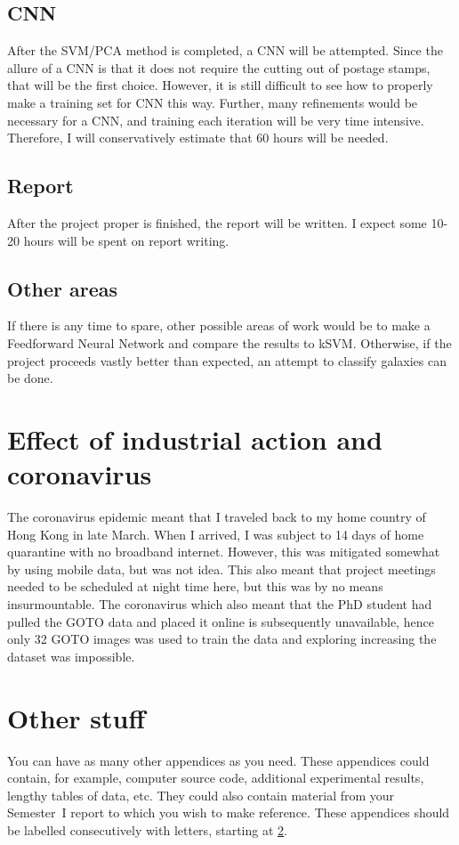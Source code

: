 \documentclass[a4paper,fleqn,usenatbib]{mnras}
\begin{document}
\subsection{CNN}
After the SVM/PCA method is completed, a CNN will be attempted. Since the allure of a CNN is that it does not require the cutting out of postage stamps, that will be the first choice. However, it is still difficult to see how to properly make a training set for CNN this way. Further, many refinements would be necessary for a CNN, and training each iteration will be very time intensive. Therefore, I will conservatively estimate that 60 hours will be needed.
\subsection{Report}
After the project proper is finished, the report will be written. I expect some 10-20 hours will be spent on report writing.
\subsection{Other areas}
If there is any time to spare, other possible areas of work would be to make a Feedforward Neural Network and compare the results to kSVM. Otherwise, if the project proceeds vastly better than expected, an attempt to classify galaxies can be done.

\section{Effect of industrial action and coronavirus}
\label{2020 special}
The coronavirus epidemic meant that I traveled back to my home country of Hong Kong in late March. When I arrived, I was subject to 14 days of home quarantine with no broadband internet. However, this was mitigated somewhat by using mobile data, but was not idea. This also meant that project meetings needed to be scheduled at night time here, but this was by no means insurmountable. The coronavirus which also meant that the PhD student had pulled the GOTO data and placed it online is subsequently unavailable, hence only 32 GOTO images was used to train the data and exploring increasing the dataset was impossible. 


\section{Other stuff}
\label{other appendices}
You can have as many other appendices as you need. These appendices could contain, for example, computer source code, additional experimental results, lengthy tables of data, etc.  They could also contain material from your Semester~I report to which you wish to make reference. These appendices should be labelled consecutively with letters, starting at \ref{other appendices}.




\bsp	%
\label{lastpage}
\end{document}
